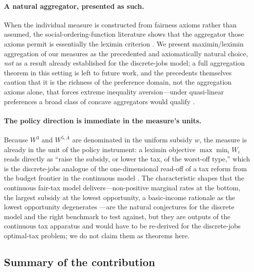 \paragraph{A natural aggregator, presented as such.}
When the individual measure is constructed from fairness axioms rather than
assumed, the social-ordering-function literature shows that the aggregator
those axioms permit is essentially the leximin criterion
\textcite{Maniquet2016,FleurbaeyManiquet2006,Valletta2009,ManiquetNeumann2021}.
We present maximin/leximin aggregation of our measures as the precedented and
axiomatically natural choice, \emph{not} as a result already established for
the discrete-jobs model; a full aggregation theorem in this setting is left to
future work, and the precedents themselves caution that it is the richness of
the preference domain, not the aggregation axioms alone, that forces extreme
inequality aversion---under quasi-linear preferences a broad class of concave
aggregators would qualify \textcite[][p.~213]{Maniquet2008}.

\paragraph{The policy direction is immediate in the measure's units.}
Because $W^3$ and $W^{5,\bar A}$ are denominated in the uniform subsidy $w$,
the measure is already in the unit of the policy instrument: a leximin
objective $\max\min_i W_i$ reads directly as ``raise the subsidy, or lower the
tax, of the worst-off type,'' which is the discrete-jobs analogue of the
one-dimensional read-off of a tax reform from the budget frontier in the
continuous model \textcite[][\S3.1]{Maniquet2016}. The characteristic shapes that
the continuous fair-tax model delivers---non-positive marginal rates at the
bottom, the largest subsidy at the lowest opportunity, a basic-income
rationale as the lowest opportunity degenerates
\textcite{FleurbaeyManiquet2006,FleurbaeyManiquet2007,ManiquetNeumann2021}---are
the natural conjectures for the discrete model and the right benchmark to
test against, but they are outputs of the continuous tax apparatus and would
have to be re-derived for the discrete-jobs optimal-tax problem; we do not
claim them as theorems here.

\subsection{Summary of the contribution}
\label{sub:summary}

